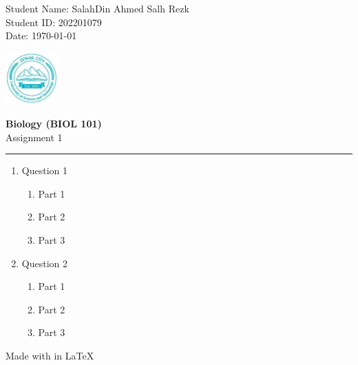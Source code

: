 \documentclass[11pt,letterpaper]{article}
\begin{document}
\pagestyle{plain}

\begin{flushleft}
Student Name: SalahDin Ahmed Salh Rezk\\
Student ID: 202201079 \\
Date: \today
\end{flushleft}

\begin{flushright}\vspace{-15mm}
\includegraphics[height=2cm]{zcust.jpg}
\end{flushright}

\begin{center}\vspace{-1cm}
\textbf{\large Biology (BIOL 101)}\\
Assignment 1
\end{center}


\rule{\linewidth}{0.1mm}

\bigskip
\bigskip

\begin{enumerate}

\item Question 1

\begin{enumerate}
    \item Part 1
    \item Part 2
    \item Part 3
\end{enumerate}

\item Question 2

\begin{enumerate}
    \item Part 1
    \item Part 2
    \item Part 3
\end{enumerate}

\end{enumerate}

\vfill
\begin{center}
    Made with  in {\LaTeX}
\end{center}
\end{document}
